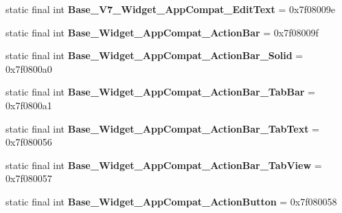 \begin{DoxyCompactItemize}
\item 
\hypertarget{classandroid_1_1support_1_1design_1_1_r_1_1style_a5143acab4e9a04013d7635ffc30fa84c}{}static final int {\bfseries Base\+\_\+\+V7\+\_\+\+Widget\+\_\+\+App\+Compat\+\_\+\+Edit\+Text} = 0x7f08009e\label{classandroid_1_1support_1_1design_1_1_r_1_1style_a5143acab4e9a04013d7635ffc30fa84c}

\item 
\hypertarget{classandroid_1_1support_1_1design_1_1_r_1_1style_a5b57339be3b00ec4fbc6d3baa428c01b}{}static final int {\bfseries Base\+\_\+\+Widget\+\_\+\+App\+Compat\+\_\+\+Action\+Bar} = 0x7f08009f\label{classandroid_1_1support_1_1design_1_1_r_1_1style_a5b57339be3b00ec4fbc6d3baa428c01b}

\item 
\hypertarget{classandroid_1_1support_1_1design_1_1_r_1_1style_a1f9e47e1c00a31c23b8ac75d6b4adb6b}{}static final int {\bfseries Base\+\_\+\+Widget\+\_\+\+App\+Compat\+\_\+\+Action\+Bar\+\_\+\+Solid} = 0x7f0800a0\label{classandroid_1_1support_1_1design_1_1_r_1_1style_a1f9e47e1c00a31c23b8ac75d6b4adb6b}

\item 
\hypertarget{classandroid_1_1support_1_1design_1_1_r_1_1style_aa4eca4c56c553fe2c7950b72fefae483}{}static final int {\bfseries Base\+\_\+\+Widget\+\_\+\+App\+Compat\+\_\+\+Action\+Bar\+\_\+\+Tab\+Bar} = 0x7f0800a1\label{classandroid_1_1support_1_1design_1_1_r_1_1style_aa4eca4c56c553fe2c7950b72fefae483}

\item 
\hypertarget{classandroid_1_1support_1_1design_1_1_r_1_1style_aa8ddc5fdad0f299e2b52eddda088ebe8}{}static final int {\bfseries Base\+\_\+\+Widget\+\_\+\+App\+Compat\+\_\+\+Action\+Bar\+\_\+\+Tab\+Text} = 0x7f080056\label{classandroid_1_1support_1_1design_1_1_r_1_1style_aa8ddc5fdad0f299e2b52eddda088ebe8}

\item 
\hypertarget{classandroid_1_1support_1_1design_1_1_r_1_1style_a2dad992aa3516234c551f7f759ff3b28}{}static final int {\bfseries Base\+\_\+\+Widget\+\_\+\+App\+Compat\+\_\+\+Action\+Bar\+\_\+\+Tab\+View} = 0x7f080057\label{classandroid_1_1support_1_1design_1_1_r_1_1style_a2dad992aa3516234c551f7f759ff3b28}

\item 
\hypertarget{classandroid_1_1support_1_1design_1_1_r_1_1style_a4c4022741dec751bc0474b30cc3f7ac7}{}static final int {\bfseries Base\+\_\+\+Widget\+\_\+\+App\+Compat\+\_\+\+Action\+Button} = 0x7f080058\label{classandroid_1_1support_1_1design_1_1_r_1_1style_a4c4022741dec751bc0474b30cc3f7ac7}


\end{DoxyCompactItemize}
